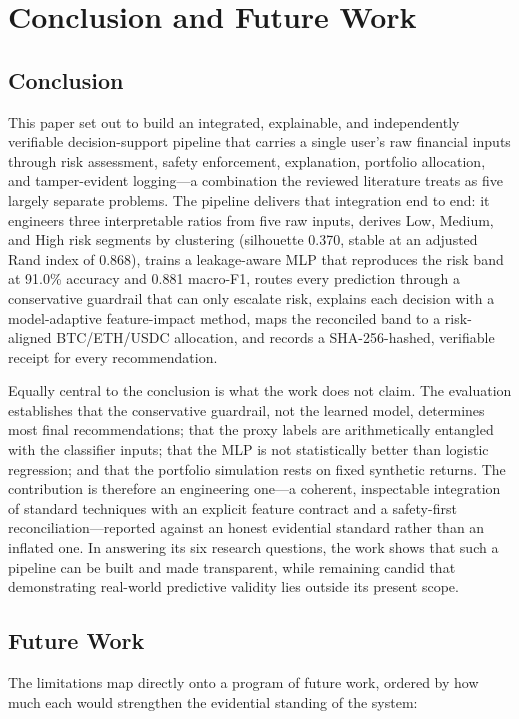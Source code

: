 \section{Conclusion and Future Work}\label{sec:conclusion}

\subsection{Conclusion}\label{subsec:conclusion}
This paper set out to build an integrated, explainable, and independently verifiable
decision-support pipeline that carries a single user's raw financial inputs through risk
assessment, safety enforcement, explanation, portfolio allocation, and tamper-evident
logging---a combination the reviewed literature treats as five largely separate problems.
The pipeline delivers that integration end to end: it engineers three interpretable ratios
from five raw inputs, derives Low, Medium, and High risk segments by clustering (silhouette
0.370, stable at an adjusted Rand index of 0.868), trains a leakage-aware MLP that
reproduces the risk band at 91.0\% accuracy and 0.881 macro-F1, routes every prediction
through a conservative guardrail that can only escalate risk, explains each decision with a
model-adaptive feature-impact method, maps the reconciled band to a risk-aligned
BTC/ETH/USDC allocation, and records a SHA-256-hashed, verifiable receipt for every
recommendation.

Equally central to the conclusion is what the work does not claim. The evaluation
establishes that the conservative guardrail, not the learned model, determines most final
recommendations; that the proxy labels are arithmetically entangled with the classifier
inputs; that the MLP is not statistically better than logistic regression; and that the
portfolio simulation rests on fixed synthetic returns. The contribution is therefore an
engineering one---a coherent, inspectable integration of standard techniques with an
explicit feature contract and a safety-first reconciliation---reported against an honest
evidential standard rather than an inflated one. In answering its six research questions,
the work shows that such a pipeline can be built and made transparent, while remaining
candid that demonstrating real-world predictive validity lies outside its present scope.

\subsection{Future Work}\label{subsec:future-work}
The limitations map directly onto a program of future work, ordered by how much each would
strengthen the evidential standing of the system:

